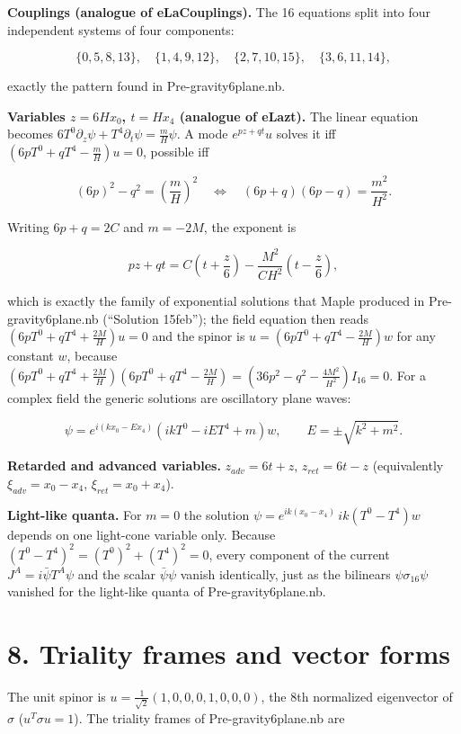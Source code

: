 \documentclass[10pt]{article}
\makeatletter
\newcommand\keepnext{\par\nopagebreak\@nobreaktrue\everypar{\@nobreakfalse\everypar{}}}
\makeatother
\begin{document}
\textbf{Couplings (analogue of eLaCouplings).} The 16 equations split into four independent systems of four components:\keepnext


\[
\{0,5,8,13\},\quad \{1,4,9,12\},\quad \{2,7,10,15\},\quad \{3,6,11,14\},
\]

exactly the pattern found in Pre-gravity6plane.nb.


\textbf{Variables $z = 6Hx_0$, $t = Hx_4$ (analogue of eLazt).} The linear equation becomes $6T^0\partial_z\psi + T^4\partial_t\psi = \frac{m}{H}\psi$. A mode $e^{pz+qt}u$ solves it iff $(6pT^0 + qT^4 - \frac mH)u = 0$, possible iff\keepnext


\[
(6p)^2 - q^2 = \left(\frac mH\right)^2 \quad\Longleftrightarrow\quad (6p+q)(6p-q) = \frac{m^2}{H^2}.
\]

Writing $6p + q = 2C$ and $m = -2M$, the exponent is\keepnext


\[
pz + qt = C\left(t + \frac z6\right) - \frac{M^2}{CH^2}\left(t - \frac z6\right),
\]

which is exactly the family of exponential solutions that Maple produced in Pre-gravity6plane.nb (``Solution 15feb''); the field equation then reads $(6pT^0 + qT^4 + \frac{2M}{H})u = 0$ and the spinor is $u = (6pT^0 + qT^4 - \frac{2M}{H})w$ for any constant $w$, because $(6pT^0+qT^4+\frac{2M}H)(6pT^0+qT^4-\frac{2M}H) = (36p^2-q^2-\frac{4M^2}{H^2})I_{16} = 0$. For a complex field the generic solutions are oscillatory plane waves:\keepnext


\[
\psi = e^{i(kx_0 - Ex_4)}\left(ikT^0 - iET^4 + m\right)w, \qquad E = \pm\sqrt{k^2+m^2}.
\]

\textbf{Retarded and advanced variables.} $z_{adv} = 6t + z$, $z_{ret} = 6t - z$ (equivalently $\xi_{adv} = x_0 - x_4$, $\xi_{ret} = x_0 + x_4$).


\textbf{Light-like quanta.} For $m = 0$ the solution $\psi = e^{ik(x_0-x_4)}\,ik(T^0 - T^4)w$ depends on one light-cone variable only. Because $(T^0 - T^4)^2 = (T^0)^2 + (T^4)^2 = 0$, every component of the current $J^A = i\bar\psi T^A\psi$ and the scalar $\bar\psi\psi$ vanish identically, just as the bilinears $\psi\sigma_{16}\psi$ vanished for the light-like quanta of Pre-gravity6plane.nb.


\section*{8. Triality frames and vector forms}

The unit spinor is $u = \frac1{\sqrt2}(1,0,0,0,1,0,0,0)$, the 8th normalized eigenvector of $\sigma$ ($u^T\sigma u = 1$). The triality frames of Pre-gravity6plane.nb are\keepnext
\end{document}
